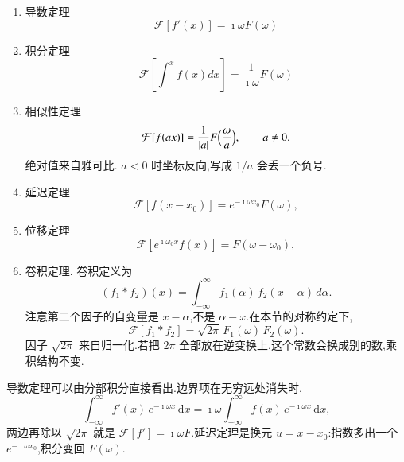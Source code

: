 \begin{enumerate}
    \item 导数定理
    \begin{equation}
        \mathcal{F} [f'(x)] = \imath \omega F(\omega)
    \end{equation}

    \item 积分定理
    \begin{equation}
        \mathcal{F} [ \int^{x} f(x) dx ] = \frac{1}{\imath \omega} F(\omega)
    \end{equation}

    \item 相似性定理
    \begin{equation}
        \mathcal{F} [ f(ax) ] = \frac{1}{|a|} F\Bigl(\frac{\omega}{a}\Bigr),
        \qquad a\neq 0.
    \end{equation}
    绝对值来自雅可比. $a<0$ 时坐标反向,写成 $1/a$ 会丢一个负号.
    \item 延迟定理
    \begin{equation}
        \mathcal{F} [ f(x - x_0 ) ] = e^{-\imath \omega x_0} F(\omega),
    \end{equation}
    \item 位移定理
    \begin{equation}
        \mathcal{F} [ e^{\imath \omega_0 x} f(x) ] = F(\omega - \omega_0),
    \end{equation}
    \item 卷积定理. 卷积定义为
    \begin{equation}
        (f_1 * f_2)(x) = \int_{-\infty}^{\infty} f_1(\alpha)\, f_2(x-\alpha)\, d\alpha .
    \end{equation}
    注意第二个因子的自变量是 $x-\alpha$,不是 $\alpha-x$.在本节的对称约定下,
    \begin{equation}
        \mathcal{F}[f_1 * f_2] = \sqrt{2\pi}\, F_1(\omega)\, F_2(\omega).
    \end{equation}
    因子 $\sqrt{2\pi}$ 来自归一化.若把 $2\pi$ 全部放在逆变换上,这个常数会换成别的数,乘积结构不变.
\end{enumerate}

导数定理可以由分部积分直接看出.边界项在无穷远处消失时,
\begin{equation}
    \int_{-\infty}^{\infty} f'(x)\, e^{-\imath \omega x}\,\mathrm{d}x
    = \imath\omega \int_{-\infty}^{\infty} f(x)\, e^{-\imath \omega x}\,\mathrm{d}x,
\end{equation}
两边再除以 $\sqrt{2\pi}$ 就是 $\mathcal{F}[f']=\imath\omega F$.延迟定理是换元 $u=x-x_0$:指数多出一个 $e^{-\imath\omega x_0}$,积分变回 $F(\omega)$.

